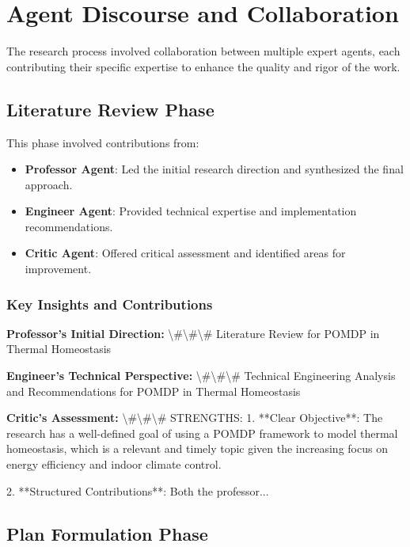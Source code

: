 \documentclass[11pt,a4paper]{article}
\begin{document}
\section{Agent Discourse and Collaboration}

The research process involved collaboration between multiple expert agents, each contributing their specific expertise to enhance the quality and rigor of the work.


\subsection{Literature Review Phase}


This phase involved contributions from:

\begin{itemize}
\item \textbf{Professor Agent}: Led the initial research direction and synthesized the final approach.
\item \textbf{Engineer Agent}: Provided technical expertise and implementation recommendations.
\item \textbf{Critic Agent}: Offered critical assessment and identified areas for improvement.
\end{itemize}

\subsubsection{Key Insights and Contributions}


\textbf{Professor's Initial Direction:} \textbackslash{}#\textbackslash{}#\textbackslash{}# Literature Review for POMDP in Thermal Homeostasis


\textbf{Engineer's Technical Perspective:} \textbackslash{}#\textbackslash{}#\textbackslash{}# Technical Engineering Analysis and Recommendations for POMDP in Thermal Homeostasis


\textbf{Critic's Assessment:} \textbackslash{}#\textbackslash{}#\textbackslash{}# STRENGTHS:
1. **Clear Objective**: The research has a well-defined goal of using a POMDP framework to model thermal homeostasis, which is a relevant and timely topic given the increasing focus on energy efficiency and indoor climate control.
  
2. **Structured Contributions**: Both the professor...


\subsection{Plan Formulation Phase}
\end{document}
